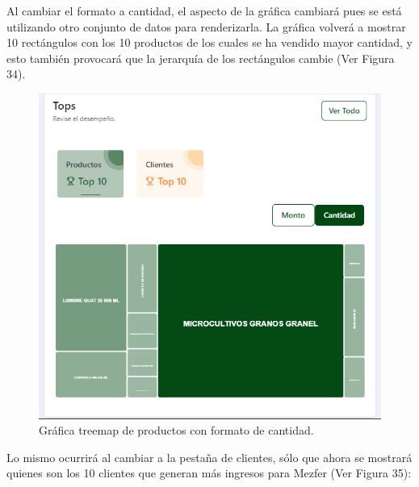 Al cambiar el formato a cantidad, el aspecto de la gráfica cambiará pues se está utilizando otro conjunto de datos para renderizarla. La gráfica volverá a mostrar 10 rectángulos con los 10 productos de los cuales se ha vendido mayor cantidad, y esto también provocará que la jerarquía de los rectángulos cambie (Ver Figura 34).

    \begin{figure}[H]
        \begin{center}
            \includegraphics[scale=0.40]{img/actividades/dahsboard-admin/top-producto-cantidad.png}
            \caption{Gráfica treemap de productos con formato de cantidad.}
            \label{fig:top-producto-cantidad}
        \end{center}
    \end{figure}

Lo mismo ocurrirá al cambiar a la pestaña de clientes, sólo que ahora se mostrará quienes son los 10 clientes que generan más ingresos para Mezfer (Ver Figura 35):

